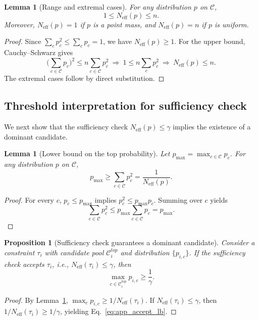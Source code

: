 \documentclass{article}
\theoremstyle{plain}
\newtheorem{proposition}[theorem]{Proposition}
\newtheorem{lemma}[theorem]{Lemma}
\theoremstyle{definition}
\theoremstyle{remark}
\begin{document}
\begin{lemma}[Range and extremal cases]
\label{lem:range}
For any distribution $p$ on $\mathcal{C}$,
\begin{equation}
1 \le N_{\mathrm{eff}}(p) \le n.
\label{eq:app_range}
\end{equation}
Moreover, $N_{\mathrm{eff}}(p)=1$ if $p$ is a point mass, and $N_{\mathrm{eff}}(p)=n$ if $p$ is uniform.
\end{lemma}
\begin{proof}
Since $\sum_c p_c^2 \le \sum_c p_c = 1$, we have $N_{\mathrm{eff}}(p)\ge 1$.
For the upper bound, Cauchy--Schwarz gives
\[
\Big(\sum_{c\in\mathcal{C}} p_c\Big)^2 \le n \sum_{c\in\mathcal{C}} p_c^2
\ \Rightarrow\
1 \le n \sum_c p_c^2
\ \Rightarrow\
N_{\mathrm{eff}}(p) \le n.
\]
The extremal cases follow by direct substitution.
\end{proof}

\subsection{Threshold interpretation for sufficiency check}

We next show that the sufficiency check $N_{\mathrm{eff}}(p)\le\gamma$ implies the existence of a dominant candidate.


\begin{lemma}[Lower bound on the top probability]
\label{lem:pmax}
Let $p_{\max}=\max_{c\in\mathcal{C}} p_c$. For any distribution $p$ on $\mathcal{C}$,
\begin{equation}
p_{\max} \ge \sum_{c\in\mathcal{C}} p_c^2 = \frac{1}{N_{\mathrm{eff}}(p)}.
\label{eq:app_pmax_lb}
\end{equation}
\end{lemma}
\begin{proof}
For every $c$, $p_c \le p_{\max}$ implies $p_c^2 \le p_{\max}p_c$.
Summing over $c$ yields
\[
\sum_{c\in\mathcal{C}} p_c^2 \le p_{\max}\sum_{c\in\mathcal{C}} p_c = p_{\max}.
\]
\end{proof}

\begin{proposition}[Sufficiency check guarantees a dominant candidate]
\label{prop:sufficiency}
Consider a constraint $\tau_i$ with candidate pool $\mathcal{C}_i^{top}$ and distribution $\{p_{i,c}\}$.
If the sufficiency check accepts $\tau_i$, i.e., $N_{\mathrm{eff}}(\tau_i)\le \gamma$, then
\begin{equation}
\max_{c\in\mathcal{C}_i^{top}} p_{i,c} \ge \frac{1}{\gamma}.
\label{eq:app_accept_lb}
\end{equation}
\end{proposition}
\begin{proof}
By Lemma~\ref{lem:pmax}, $\max_c p_{i,c} \ge 1/N_{\mathrm{eff}}(\tau_i)$.
If $N_{\mathrm{eff}}(\tau_i)\le\gamma$, then $1/N_{\mathrm{eff}}(\tau_i)\ge 1/\gamma$, yielding Eq.~\ref{eq:app_accept_lb}.
\end{proof}
\end{document}
